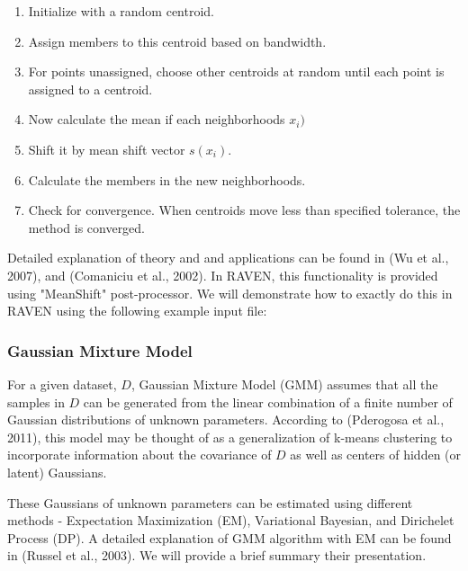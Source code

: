 \documentclass[11pt]{article}
\begin{document}
\begin{enumerate}

\item Initialize with a random centroid. 

\item Assign members to this centroid based on bandwidth. 

\item For points unassigned, choose other centroids at random until each point is assigned to a centroid. 

\item Now calculate the mean if each neighborhoods $x_i)$ 

\item Shift it by mean shift vector $s(x_i)$. 

\item Calculate the members in the new neighborhoods. 

\item Check for convergence. When centroids move less than specified tolerance, the method is converged. 
 
\end{enumerate}

Detailed explanation of theory and and applications can be found in (Wu et al., 2007), and (Comaniciu et al., 2002). In RAVEN, this functionality is provided using "MeanShift" post-processor. We will demonstrate how to exactly do this in RAVEN using the following example input file: 


\subsubsection{Gaussian Mixture Model}

For a given dataset, $D$, Gaussian Mixture Model (GMM) assumes that all the samples in $D$ can be generated from the linear combination of a finite number of Gaussian distributions of unknown parameters. According to (Pderogosa et al., 2011), this model may be thought of as a generalization of k-means clustering to incorporate information about the covariance of $D$ as well as centers of hidden (or latent) Gaussians. 

These Gaussians of unknown parameters can be estimated using different methods - Expectation Maximization (EM), Variational Bayesian, and Dirichelet Process (DP). A detailed explanation of GMM algorithm with EM can be found in (Russel et al., 2003). We will provide a brief summary their presentation.  
\end{document}
